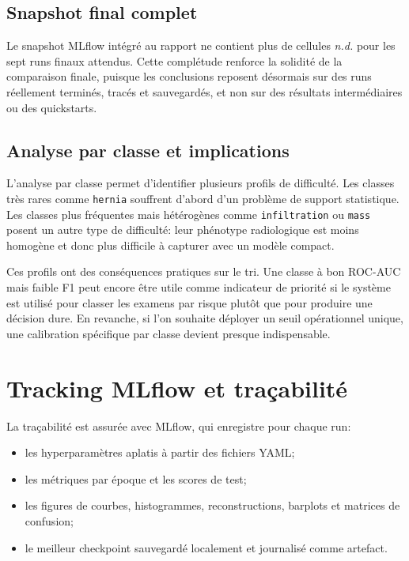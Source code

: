 \documentclass[11pt,a4paper]{article}
\newif\ifsectionbreakenabled
\let\oldsection\section
\renewcommand{\section}[1]{%
    \ifsectionbreakenabled
        \clearpage
    \else
        \sectionbreakenabledtrue
    \fi
    \oldsection{#1}%
}
\begin{document}
\subsection{Snapshot final complet}
Le snapshot MLflow int\'egr\'e au rapport ne contient plus de cellules \emph{n.d.} pour les sept runs finaux attendus. Cette compl\'etude renforce la solidit\'e de la comparaison finale, puisque les conclusions reposent d\'esormais sur des runs r\'eellement termin\'es, trac\'es et sauvegard\'es, et non sur des r\'esultats interm\'ediaires ou des quickstarts.

\subsection{Analyse par classe et implications}
L'analyse par classe permet d'identifier plusieurs profils de difficult\'e. Les classes tr\`es rares comme \texttt{hernia} souffrent d'abord d'un probl\`eme de support statistique. Les classes plus fr\'equentes mais h\'et\'erog\`enes comme \texttt{infiltration} ou \texttt{mass} posent un autre type de difficult\'e: leur ph\'enotype radiologique est moins homog\`ene et donc plus difficile \`a capturer avec un mod\`ele compact.

Ces profils ont des cons\'equences pratiques sur le tri. Une classe \`a bon ROC-AUC mais faible F1 peut encore \^etre utile comme indicateur de priorit\'e si le syst\`eme est utilis\'e pour classer les examens par risque plut\^ot que pour produire une d\'ecision dure. En revanche, si l'on souhaite d\'eployer un seuil op\'erationnel unique, une calibration sp\'ecifique par classe devient presque indispensable.

\section{Tracking MLflow et tra\c{c}abilit\'e}
La tra\c{c}abilit\'e est assur\'ee avec MLflow, qui enregistre pour chaque run:
\begin{itemize}
    \item les hyperparam\`etres aplatis \`a partir des fichiers YAML;
    \item les m\'etriques par \'epoque et les scores de test;
    \item les figures de courbes, histogrammes, reconstructions, barplots et matrices de confusion;
    \item le meilleur checkpoint sauvegard\'e localement et journalis\'e comme artefact.
\end{itemize}
\end{document}

